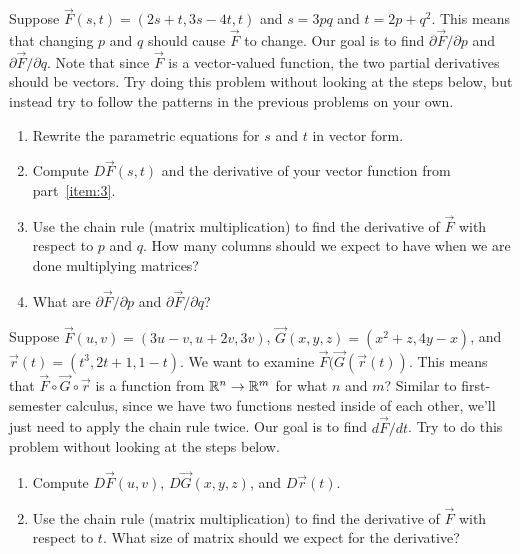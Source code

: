 \begin{problem}
 Suppose $\vec F(s,t) = (2s+t,3s-4t,t)$ and $s=3pq$ and $t=2p+q^2$.  This means that changing $p$ and $q$ should cause $\vec F$ to change. Our goal is to find $\partial \vec F/\partial p$ and $\partial \vec F/\partial q$. Note that since $\vec F$ is a vector-valued function, the two partial derivatives should be vectors. Try doing this problem without looking at the steps below, but instead try to follow the patterns in the previous problems on your own. 
 \begin{enumerate}
  \item\label{item:3} Rewrite the parametric equations for $s$ and $t$ in vector form.
  \item Compute $D\vec F(s,t)$ and the derivative of your vector function from part~\ref{item:3}.
  \item Use the chain rule (matrix multiplication) to find the derivative of $\vec F$ with respect to $p$ and $q$.  How many columns should we expect to have when we are done multiplying matrices?
  \item What are $\partial \vec F/\partial p$ and $\partial \vec F/\partial q$? 
 \end{enumerate}
\end{problem}

\begin{problem}
 Suppose $\vec F(u,v) = (3u-v,u+2v,3v)$,  $\vec G(x,y,z)=(x^2+z, 4y-x)$, and $\vec r(t) = (t^3, 2t+1, 1-t)$.  We want to examine $\vec F(\vec G(\vec r(t))$.  This means that $\vec F\circ \vec G\circ \vec r$ is a function from $\mathbb{R}^n\to\mathbb{R}^m$ for what $n$ and $m$?  Similar to first-semester calculus, since we have two functions nested inside of each other, we'll just need to apply the chain rule twice.  Our goal is to find $d\vec F/dt$.  Try to do this problem without looking at the steps below.
 \begin{enumerate}
  \item Compute $D\vec F(u,v)$, $D\vec G(x,y,z)$, and $D\vec r(t)$.
  \item Use the chain rule (matrix multiplication) to find the derivative of $\vec F$ with respect to $t$.  What size of matrix should we expect for the derivative?
 \end{enumerate}
\end{problem}



